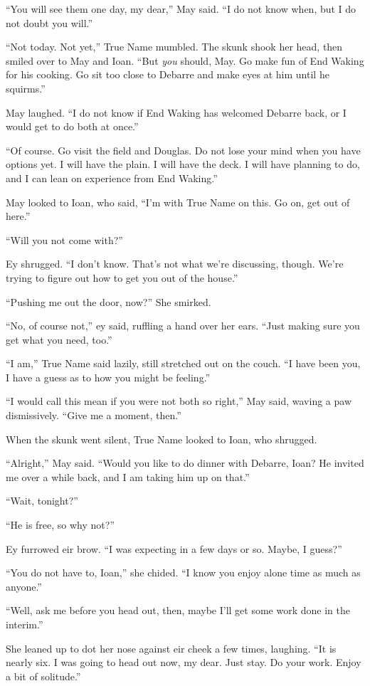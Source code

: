 ``You will see them one day, my dear,'' May said. ``I do not know when, but I do not doubt you will.''

``Not today. Not yet,'' True Name mumbled. The skunk shook her head, then smiled over to May and Ioan. ``But \emph{you} should, May. Go make fun of End Waking for his cooking. Go sit too close to Debarre and make eyes at him until he squirms.''

May laughed. ``I do not know if End Waking has welcomed Debarre back, or I would get to do both at once.''

``Of course. Go visit the field and Douglas. Do not lose your mind when you have options yet. I will have the plain. I will have the deck. I will have planning to do, and I can lean on experience from End Waking.''

May looked to Ioan, who said, ``I'm with True Name on this. Go on, get out of here.''

``Will you not come with?''

Ey shrugged. ``I don't know. That's not what we're discussing, though. We're trying to figure out how to get you out of the house.''

``Pushing me out the door, now?'' She smirked.

``No, of course not,'' ey said, ruffling a hand over her ears. ``Just making sure you get what you need, too.''

``I am,'' True Name said lazily, still stretched out on the couch. ``I have been you, I have a guess as to how you might be feeling.''

``I would call this mean if you were not both so right,'' May said, waving a paw dismissively. ``Give me a moment, then.''

When the skunk went silent, True Name looked to Ioan, who shrugged.

``Alright,'' May said. ``Would you like to do dinner with Debarre, Ioan? He invited me over a while back, and I am taking him up on that.''

``Wait, tonight?''

``He is free, so why not?''

Ey furrowed eir brow. ``I was expecting in a few days or so. Maybe, I guess?''

``You do not have to, Ioan,'' she chided. ``I know you enjoy alone time as much as anyone.''

``Well, ask me before you head out, then, maybe I'll get some work done in the interim.''

She leaned up to dot her nose against eir cheek a few times, laughing. ``It is nearly six. I was going to head out now, my dear. Just stay. Do your work. Enjoy a bit of solitude.''

